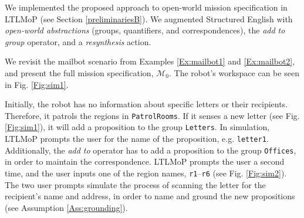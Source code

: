 We implemented the proposed approach to open-world mission specification in LTLMoP (see Section \ref{preliminariesB}). We augmented Structured English with \emph{open-world abstractions} (groups, quantifiers, and correspondences), the \emph{add to group} operator, and a \emph{resynthesis} action.

\begin{myExample}\label{Ex:mailbot3} We revisit the mailbot scenario from Examples \ref{Ex:mailbot1} and \ref{Ex:mailbot2}, and present the full mission specification, $\mathcal{M}_0$.
The robot's workspace can be seen in Fig. \ref{Fig:sim1}.
\end{myExample}

Initially, the robot has no information about specific letters or their recipients. Therefore, it patrols the regions in \texttt{PatrolRooms}. If it senses a new letter (see Fig. \ref{Fig:sim1}), it will add a proposition to the group \texttt{Letters}. In simulation, LTLMoP prompts the user for the name of the proposition, e.g. \texttt{letter1}. Additionally, the \emph{add to} operator has to add a proposition to the group \texttt{Offices}, in order to maintain the correspondence. LTLMoP prompts the user a second time, and the user inputs one of the region names, \texttt{r1}--\texttt{r6} (see Fig. \ref{Fig:sim2}). The two user prompts simulate the process of scanning the letter for the recipient's name and address, in order to name and ground the new propositions (see Assumption \ref{Ass:grounding}).

